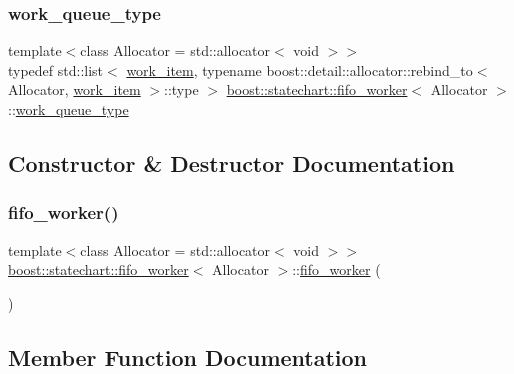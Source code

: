\subsubsection{\texorpdfstring{work\+\_\+queue\+\_\+type}{work\_queue\_type}}
{\footnotesize\ttfamily template$<$class Allocator = std\+::allocator$<$ void $>$$>$ \\
typedef std\+::list$<$ \mbox{\hyperlink{classboost_1_1statechart_1_1fifo__worker_ac90f6805565bb3e8d65e4cdde96d90c2}{work\+\_\+item}}, typename boost\+::detail\+::allocator\+::rebind\+\_\+to$<$ Allocator, \mbox{\hyperlink{classboost_1_1statechart_1_1fifo__worker_ac90f6805565bb3e8d65e4cdde96d90c2}{work\+\_\+item}} $>$\+::type $>$ \mbox{\hyperlink{classboost_1_1statechart_1_1fifo__worker}{boost\+::statechart\+::fifo\+\_\+worker}}$<$ Allocator $>$\+::\mbox{\hyperlink{classboost_1_1statechart_1_1fifo__worker_a59c84b45f3d55dfdd63e7627d0fa2e7b}{work\+\_\+queue\+\_\+type}}\hspace{0.3cm}{\ttfamily [private]}}



\subsection{Constructor \& Destructor Documentation}
\mbox{\label{classboost_1_1statechart_1_1fifo__worker_a27e65c9ac66783bdf8a459f83e814946}} 
\subsubsection{\texorpdfstring{fifo\+\_\+worker()}{fifo\_worker()}}
{\footnotesize\ttfamily template$<$class Allocator = std\+::allocator$<$ void $>$$>$ \\
\mbox{\hyperlink{classboost_1_1statechart_1_1fifo__worker}{boost\+::statechart\+::fifo\+\_\+worker}}$<$ Allocator $>$\+::\mbox{\hyperlink{classboost_1_1statechart_1_1fifo__worker}{fifo\+\_\+worker}} (\begin{DoxyParamCaption}{ }\end{DoxyParamCaption})\hspace{0.3cm}{\ttfamily [inline]}}



\subsection{Member Function Documentation}
\mbox{\label{classboost_1_1statechart_1_1fifo__worker_a63316cebc1a5e703b5e4765b577addfa}} 
